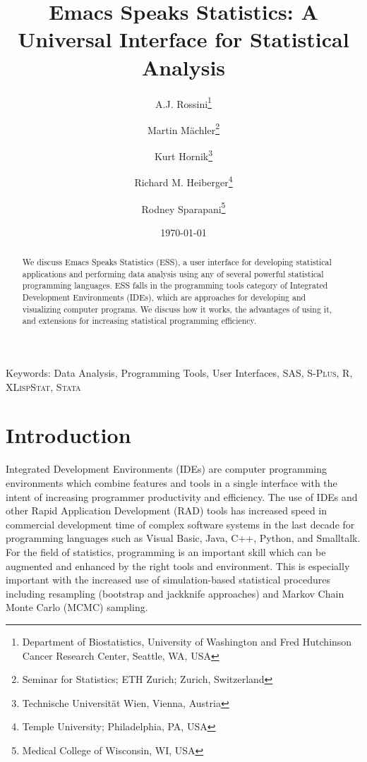 \documentclass{article}
\title{Emacs Speaks Statistics: A Universal Interface for
  Statistical Analysis}
\author{A.J. Rossini\footnote{Department of Biostatistics, University
    of Washington and Fred Hutchinson Cancer Research Center, Seattle,
    WA, USA} \and Martin M{\"a}chler\footnote{Seminar for Statistics;
    ETH Zurich; Zurich, Switzerland} \and Kurt
  Hornik\footnote{Technische Universit{\"a}t Wien, Vienna, Austria}
  \and Richard M. Heiberger\footnote{Temple University; Philadelphia,
    PA, USA} \and Rodney Sparapani\footnote{Medical College of
    Wisconsin, WI, USA}}
\date{\today}
\newif\ifpdf
\newcommand*{\Splus}{\textsc{S-Plus}}
\newcommand*{\XLispStat}{\textsc{XLispStat}}
\newcommand*{\Stata}{\textsc{Stata}}
\begin{document}
\ifpdf
  \DeclareGraphicsExtensions{.jpg,.pdf,.png,.mps}
\fi


\singlespace

\maketitle

Keywords: Data Analysis, Programming Tools, User Interfaces, SAS,
\Splus, R, \XLispStat, \Stata

\begin{abstract}
  We discuss Emacs Speaks Statistics (ESS), a user interface for
  developing statistical applications and performing data analysis
  using any of several powerful statistical programming languages.
  ESS falls in the programming tools category of Integrated
  Development Environments (IDEs), which are approaches for developing
  and visualizing computer programs.  We discuss how it works, the
  advantages of using it, and extensions for increasing statistical
  programming efficiency.
\end{abstract}

\doublespace

\section{Introduction}
\label{sec:intro}

Integrated Development Environments (IDEs) are computer programming
environments which combine features and tools in a single interface
with the intent of increasing programmer productivity and efficiency.
The use of IDEs and other Rapid Application Development (RAD) tools
has increased speed in commercial development time of complex software
systems in the last decade for programming languages such as Visual
Basic, Java, C++, Python, and Smalltalk.  For the field of statistics,
programming is an important skill which can be augmented and enhanced
by the right tools and environment.  This is especially important with
the increased use of simulation-based statistical procedures including
resampling (bootstrap and jackknife approaches) and Markov Chain Monte
Carlo (MCMC) sampling.
\end{document}
